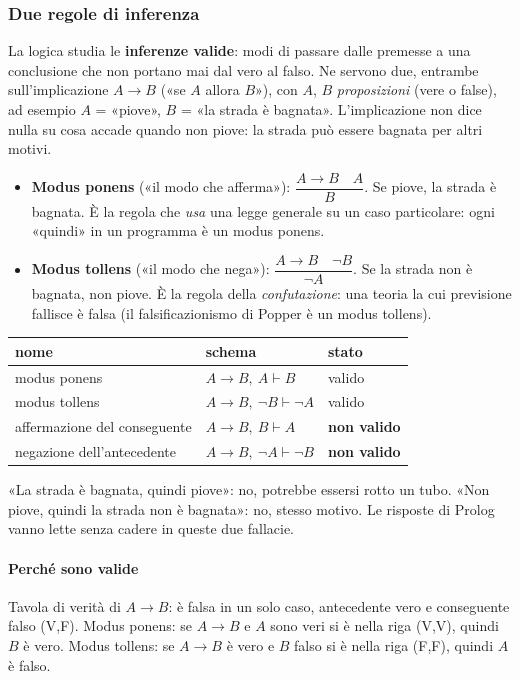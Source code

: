 \documentclass[a4paper,12pt]{article}
\begin{document}
\subsubsection{Due regole di inferenza}
La logica studia le \textbf{inferenze valide}: modi di passare dalle premesse a una conclusione
che non portano mai dal vero al falso. Ne servono due, entrambe sull'implicazione $A \to B$
(«se $A$ allora $B$»), con $A$, $B$ \emph{proposizioni} (vere o false), ad esempio
$A$ = «piove», $B$ = «la strada è bagnata». L'implicazione non dice nulla su cosa accade quando
non piove: la strada può essere bagnata per altri motivi.
\begin{itemize}
  \item \textbf{Modus ponens} («il modo che afferma»): $\dfrac{A \to B \quad A}{B}$. Se piove,
        la strada è bagnata. È la regola che \emph{usa} una legge generale su un caso
        particolare: ogni «quindi» in un programma è un modus ponens.
  \item \textbf{Modus tollens} («il modo che nega»): $\dfrac{A \to B \quad \neg B}{\neg A}$. Se
        la strada non è bagnata, non piove. È la regola della \emph{confutazione}: una teoria la
        cui previsione fallisce è falsa (il falsificazionismo di Popper è un modus tollens).
\end{itemize}
\begin{center}
\begin{tabular}{|l|l|l|}
\hline
\textbf{nome} & \textbf{schema} & \textbf{stato} \\
\hline
modus ponens & $A \to B,\ A \vdash B$ & valido \\
modus tollens & $A \to B,\ \neg B \vdash \neg A$ & valido \\
affermazione del conseguente & $A \to B,\ B \vdash A$ & \textbf{non valido} \\
negazione dell'antecedente & $A \to B,\ \neg A \vdash \neg B$ & \textbf{non valido} \\
\hline
\end{tabular}
\end{center}
«La strada è bagnata, quindi piove»: no, potrebbe essersi rotto un tubo. «Non piove, quindi la
strada non è bagnata»: no, stesso motivo. Le risposte di Prolog vanno lette senza cadere in
queste due fallacie.

\paragraph{Perché sono valide} Tavola di verità di $A \to B$: è falsa in un solo caso,
antecedente vero e conseguente falso (V,F). Modus ponens: se $A \to B$ e $A$ sono veri si è nella
riga (V,V), quindi $B$ è vero. Modus tollens: se $A \to B$ è vero e $B$ falso si è nella riga
(F,F), quindi $A$ è falso.
\end{document}
